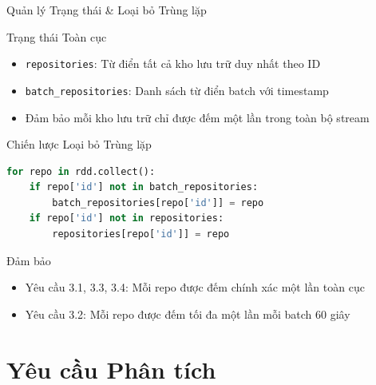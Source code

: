 \documentclass[aspectratio=169]{beamer}
\begin{document}
\begin{frame}{Quản lý Trạng thái \& Loại bỏ Trùng lặp}
    \begin{block}{Trạng thái Toàn cục}
        \begin{itemize}
            \item \texttt{repositories}: Từ điển tất cả kho lưu trữ duy nhất theo ID
            \item \texttt{batch\_repositories}: Danh sách từ điển batch với timestamp
            \item Đảm bảo mỗi kho lưu trữ chỉ được đếm một lần trong toàn bộ stream
        \end{itemize}
    \end{block}
    
    \vspace{0.3cm}
    \begin{block}{Chiến lược Loại bỏ Trùng lặp}
        \begin{lstlisting}[language=Python, basicstyle=\tiny]
for repo in rdd.collect():
    if repo['id'] not in batch_repositories:
        batch_repositories[repo['id']] = repo
    if repo['id'] not in repositories:
        repositories[repo['id']] = repo
        \end{lstlisting}
    \end{block}
    
    \vspace{0.3cm}
    \begin{alertblock}{Đảm bảo}
        \begin{itemize}
            \item Yêu cầu 3.1, 3.3, 3.4: Mỗi repo được đếm chính xác một lần toàn cục
            \item Yêu cầu 3.2: Mỗi repo được đếm tối đa một lần mỗi batch 60 giây
        \end{itemize}
    \end{alertblock}
\end{frame}

\section{Yêu cầu Phân tích}
\end{document}
